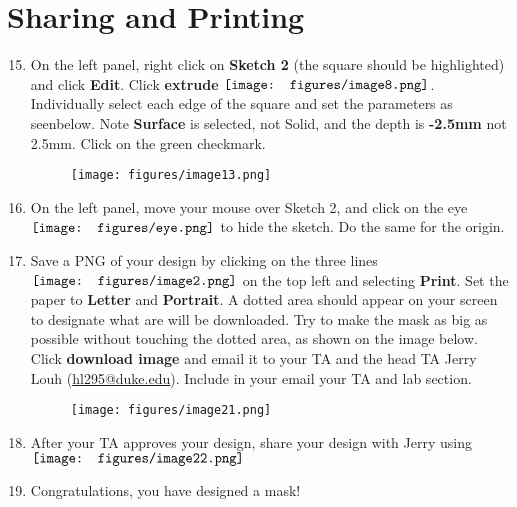 \documentclass[12pt]{../manual}
\begin{document}
\section{Sharing and Printing}
\begin{enumerate}
\setcounter{enumi}{14}
\item On the left panel, right click on {\bf Sketch 2} (the square should be highlighted) and click {\bf Edit}. Click {\bf extrude} $\vcenter{\hbox{\texttt{[image: figures/image8.png]}}}$. Individually select each edge of the square and set the parameters as seenbelow. Note {\bf Surface} is selected, not Solid, and the depth is {\bf-2.5mm} not 2.5mm. Click on the green checkmark.
\begin{figure}[ht!]
\centering
\texttt{[image: figures/image13.png]}
\end{figure}
\item On the left panel, move your mouse over Sketch 2, and click on the eye $\vcenter{\hbox{\texttt{[image: figures/eye.png]}}}$ to hide the sketch. Do the same for the origin.
\newpage
\item Save a PNG of your design by clicking on the three lines $\vcenter{\hbox{\texttt{[image: figures/image2.png]}}}$  on the top left and selecting {\bf Print}. Set the paper to {\bf Letter} and {\bf Portrait}. A dotted area should appear on your screen to designate what are will be downloaded. Try to make the mask as big as possible without touching the dotted area, as shown on the image below. Click {\bf download image} and email it to your TA and the head TA Jerry Louh (\href{hl295@duke.edu}{hl295@duke.edu}). Include in your email your TA and lab section.
\begin{figure}[ht!]
\centering
\texttt{[image: figures/image21.png]}
\end{figure}

\item After your TA approves your design, share your design with Jerry using $\vcenter{\hbox{\texttt{[image: figures/image22.png]}}}$
\item Congratulations, you have designed a mask!
\end{enumerate}
\end{document}
